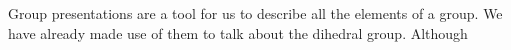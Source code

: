 \documentclass[../main.tex]{subfiles}
\begin{document}
Group presentations are a tool for us to describe all the elements of a group.
We have already made use of them to talk about the dihedral group. Although 
\end{document}
